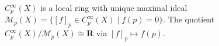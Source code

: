 $C_p^\infty(X)$ is a local ring with unique maximal ideal $\mathcal{M}_p(X) = \{[f]_p \in C_p^\infty(X) \mid f(p) = 0\}$. The quotient $C_p^\infty(X)/\mathcal{M}_p(X) \cong \mathbf{R}$ via $[f]_p \mapsto f(p)$.
